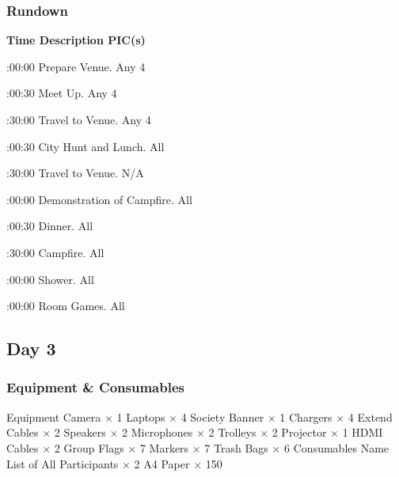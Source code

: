 \subsubsection{Rundown}

\setupTABLE[c][1][width=1.25in]
\setupTABLE[c][2][width=3.5in]
\setupTABLE[c][3][width=1.25in]
\bTABLE
\bTABLEhead

\bTR\bTH    \bf{Time}
\eTH\bTH    \bf{Description}
\eTH\bTH    \bf{PIC(s)}
\eTH\eTR

\eTABLEhead
\bTABLEbody

\bTR{}:00:00
\eTD\bTD Prepare Venue.
\eTD\bTD Any 4
\eTD\eTR

\bTR{}:00:30
\eTD\bTD Meet Up.
\eTD\bTD Any 4
\eTD\eTR

\bTR{}:30:00
\eTD\bTD Travel to Venue.
\eTD\bTD Any 4
\eTD\eTR

\bTR{}:00:30
\eTD\bTD City Hunt and Lunch.
\eTD\bTD All
\eTD\eTR

\bTR{}:30:00
\eTD\bTD Travel to Venue.
\eTD\bTD N/A
\eTD\eTR

\bTR{}:00:00
\eTD\bTD Demonstration of Campfire.
\eTD\bTD All
\eTD\eTR

\bTR{}:00:30
\eTD\bTD Dinner.
\eTD\bTD All
\eTD\eTR

\bTR{}:30:00
\eTD\bTD Campfire.
\eTD\bTD All
\eTD\eTR

\bTR{}:00:00
\eTD\bTD Shower.
\eTD\bTD All
\eTD\eTR

\bTR{}:00:00
\eTD\bTD Room Games.
\eTD\bTD All
\eTD\eTR

\eTABLEbody
\eTABLE


\subsection{Day 3}

\subsubsection{Equipment \& Consumables}
\starttabulate[|l|l|]
\NC{}Equipment\NC\NR
\HL
\NC Camera \NC $\times$ 1 \NR
\NC Laptops \NC $\times$ 4 \NR
\NC Society Banner \NC $\times$ 1 \NR
\NC Chargers \NC $\times$ 4 \NR
\NC Extend Cables \NC $\times$ 2 \NR
\NC Speakers \NC $\times$ 2 \NR
\NC Microphones \NC $\times$ 2 \NR
\NC Trolleys \NC $\times$ 2 \NR
\NC Projector \NC $\times$ 1 \NR
\NC HDMI Cables \NC $\times$ 2 \NR
\NC Group Flags \NC $\times$ 7 \NR
\NC Markers \NC $\times$ 7 \NR
\NC Trash Bags \NC $\times$ 6 \NR
\HL
\NR
\NC{}Consumables\NC\NR
\HL
\NC Name List of All Participants \NC $\times$ 2 \NR
\NC A4 Paper \NC $\times$ 150 \NR
\HL
\stoptabulate

